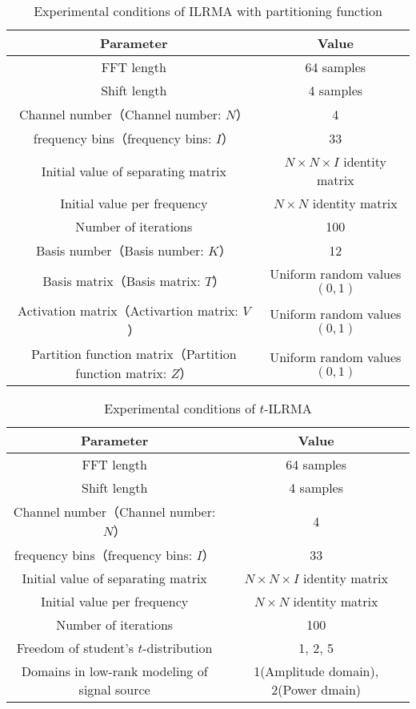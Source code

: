 \begin{table}[t]
  \caption{Experimental conditions of ILRMA with partitioning function}
  \centering
  \begin{tabular}{cc} \hline
    Parameter & Value \\ \hline \hline
    FFT length & 64 samples  \\ \hline
    Shift length & 4 samples \\ \hline
    Channel number（Channel number: $N$） & 4 \\ \hline
    frequency bins（frequency bins: $I$） & 33 \\ \hline 
    Initial value of separating matrix & $N \times N \times I$ identity matrix  \\ \hline
    Initial value per frequency & $N \times N$ identity matrix  \\ \hline
    Number of iterations & 100\\ \hline
    Basis number（Basis number: $K$） & 12 \\ \hline
    Basis matrix（Basis matrix: $T$） & Uniform random values $(0,1)$ \\ \hline
    Activation matrix（Activartion matrix: $V$） & Uniform random values $(0,1)$ \\ \hline 
    Partition function matrix（Partition function matrix: $Z$） & Uniform random values $(0,1)$ \\ \hline \hline
  \end{tabular}
  \label{tab:variableilrma}
\end{table}
\begin{table}[t] 
  \caption{Experimental conditions of $t$-ILRMA}
  \centering
  \begin{tabular}{cc}\hline
    Parameter & Value \\ \hline \hline
    FFT length & 64 samples  \\ \hline
    Shift length & 4 samples \\ \hline
    Channel number（Channel number: $N$） & 4 \\ \hline
    frequency bins（frequency bins: $I$） & 33 \\ \hline
    Initial value of separating matrix & $N \times N \times I$ identity matrix  \\ \hline
    Initial value per frequency & $N \times N$ identity matrix  \\ \hline
    Number of iterations & 100\\ \hline
    Freedom of student's $t$-distribution & 1, 2, 5\\ \hline
    Domains in low-rank modeling of signal source & 1(Amplitude domain), 2(Power dmain)\\ \hline
  \end{tabular}
  \label{tab:tilrma}
\end{table}

